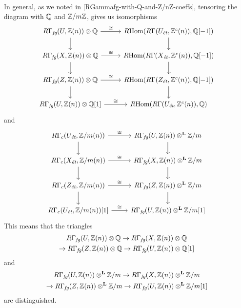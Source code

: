 \begin{nameless}
  In general, as we noted in \ref{RGammafg-with-Q-and-Z/nZ-coeffs}, tensoring
  the diagram with $\mathbb{Q}$ and $\mathbb{Z}/m\mathbb{Z}$, gives us isomorphisms
  \[ \begin{tikzcd}
      R\Gamma_\text{\it fg} (U, \ZZ(n)) \otimes \QQ \ar{r}{\isom}\ar{d} & \RHom (R\Gamma (U_\text{\it ét}, \ZZ^c (n)), \QQ [-1]) \ar{d} \\
      R\Gamma_\text{\it fg} (X, \ZZ(n)) \otimes \QQ\ar{r}{\isom}\ar{d} & \RHom (R\Gamma (X_\text{\it ét}, \ZZ^c (n)), \QQ [-1]) \ar{d} \\
      R\Gamma_\text{\it fg} (Z, \ZZ(n)) \otimes \QQ\ar{r}{\isom}\ar{d} & \RHom (R\Gamma (Z_\text{\it ét}, \ZZ^c (n)), \QQ [-1]) \ar{d} \\
      R\Gamma_\text{\it fg} (U, \ZZ(n)) \otimes \QQ [1]\ar{r}{\isom} & \RHom (R\Gamma (U_\text{\it ét}, \ZZ^c (n)), \QQ)
    \end{tikzcd} \]
  and
  \[ \begin{tikzcd}
      R\Gamma_c (U_\text{\it ét}, \ZZ/m (n)) \ar{d}\ar{r}{\isom} & R\Gamma_\text{\it fg} (U, \ZZ(n)) \otimes^\mathbf{L} \ZZ/m\ar{d} \\
      R\Gamma_c (X_\text{\it ét}, \ZZ/m (n)) \ar{d}\ar{r}{\isom} & R\Gamma_\text{\it fg} (X, \ZZ(n)) \otimes^\mathbf{L} \ZZ/m\ar{d} \\
      R\Gamma_c (Z_\text{\it ét}, \ZZ/m (n)) \ar{d}\ar{r}{\isom} & R\Gamma_\text{\it fg} (Z, \ZZ(n)) \otimes^\mathbf{L} \ZZ/m\ar{d} \\
      R\Gamma_c (U_\text{\it ét}, \ZZ/m (n)) [1]\ar{r}{\isom} & R\Gamma_\text{\it fg} (U, \ZZ(n)) \otimes^\mathbf{L} \ZZ/m [1]
    \end{tikzcd} \]
  This means that the triangles
  \begin{multline}
    \label{eqn:RGammafg-triangle-constructed-naively-tensored-with-Q}
    R\Gamma_\text{\it fg} (U, \mathbb{Z}(n)) \otimes \mathbb{Q} \to
    R\Gamma_\text{\it fg} (X, \mathbb{Z}(n)) \otimes \mathbb{Q} \\
    \to R\Gamma_\text{\it fg} (Z, \mathbb{Z}(n)) \otimes \mathbb{Q} \to
    R\Gamma_\text{\it fg} (U, \mathbb{Z}(n)) \otimes \mathbb{Q} [1]
  \end{multline}
  and
  \begin{multline}
    \label{eqn:RGammafg-triangle-constructed-naively-tensored-with-Z/m}
    R\Gamma_\text{\it fg} (U, \mathbb{Z}(n)) \otimes^\mathbf{L} \mathbb{Z}/m \to
    R\Gamma_\text{\it fg} (X, \mathbb{Z}(n)) \otimes^\mathbf{L} \mathbb{Z}/m \\
    \to R\Gamma_\text{\it fg} (Z, \mathbb{Z}(n)) \otimes^\mathbf{L} \mathbb{Z}/m \to
    R\Gamma_\text{\it fg} (U, \mathbb{Z}(n)) \otimes^\mathbf{L} \mathbb{Z}/m [1]
  \end{multline}
  are distinguished.
\end{nameless}

